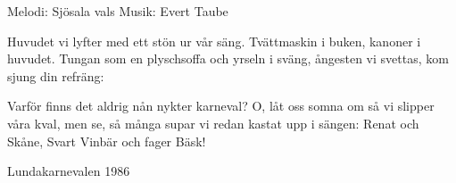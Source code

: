 \begin{song}

\begin{songmeta}
Melodi: Sjösala vals
Musik: Evert Taube
\end{songmeta}

\begin{songtext}
Huvudet vi lyfter med ett stön ur vår säng.
Tvättmaskin i buken, kanoner i huvudet.
Tungan som en plyschsoffa och yrseln i sväng,
ångesten vi svettas, kom sjung din refräng:

Varför finns det aldrig nån nykter karneval?
O, låt oss somna om så vi slipper våra kval,
men se, så många supar vi redan kastat upp i sängen:
Renat och Skåne, Svart Vinbär och fager Bäsk!
\end{songtext}

\begin{songnotes}
Lundakarnevalen 1986
\end{songnotes}

\end{song}
